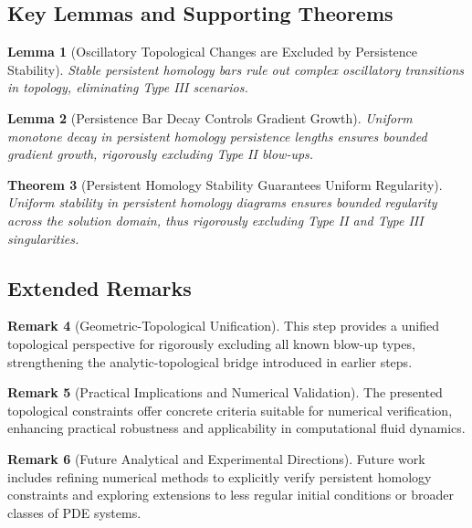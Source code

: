 \documentclass[11pt]{article}
\newtheorem{theorem}{Theorem}[section]
\newtheorem{lemma}[theorem]{Lemma}
\theoremstyle{definition}
\newtheorem{remark}[theorem]{Remark}
\begin{document}
\subsection*{Key Lemmas and Supporting Theorems}

\begin{lemma}[Oscillatory Topological Changes are Excluded by Persistence Stability]
Stable persistent homology bars rule out complex oscillatory transitions in topology, eliminating Type III scenarios.
\end{lemma}

\begin{lemma}[Persistence Bar Decay Controls Gradient Growth]
Uniform monotone decay in persistent homology persistence lengths ensures bounded gradient growth, rigorously excluding Type II blow-ups.
\end{lemma}

\begin{theorem}[Persistent Homology Stability Guarantees Uniform Regularity]
Uniform stability in persistent homology diagrams ensures bounded regularity across the solution domain, thus rigorously excluding Type II and Type III singularities.
\end{theorem}

\subsection*{Extended Remarks}
\begin{remark}[Geometric-Topological Unification]
This step provides a unified topological perspective for rigorously excluding all known blow-up types, strengthening the analytic-topological bridge introduced in earlier steps.
\end{remark}

\begin{remark}[Practical Implications and Numerical Validation]
The presented topological constraints offer concrete criteria suitable for numerical verification, enhancing practical robustness and applicability in computational fluid dynamics.
\end{remark}

\begin{remark}[Future Analytical and Experimental Directions]
Future work includes refining numerical methods to explicitly verify persistent homology constraints and exploring extensions to less regular initial conditions or broader classes of PDE systems.
\end{remark}
\end{document}
